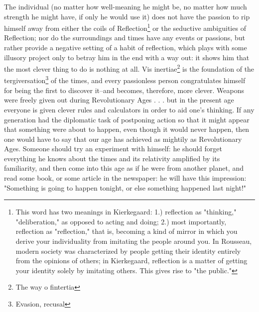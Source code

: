 \documentclass[12pt]{article}
\begin{document}
   The individual (no matter how well-meaning he might be, no matter how
much strength he might have, if only he would use it) does not have the
passion to rip himself away from either the coils of 
Reflection\footnote{This word has two meanings in Kierkegaard: 1.) reflection as "thinking,"
"deliberation," as opposed to acting and doing; 2.) most importantly,
reflection as "reflection," that is, becoming a kind of mirror in which you
derive your individuality from imitating the people around you. In Rousseau,
modern society was characterized by people getting their identity entirely
from the opinions of others; in Kierkegaard, reflection is a matter of
getting your identity solely by imitating others. This gives rise to "the
public."} or the
seductive ambiguities of Reflection; nor do the surroundings and times have
any events or passions, but rather provide a negative setting of a habit of
reflection, which plays with some illusory project only to betray him in the
end with a way out: it shows him that the most clever thing to do is nothing
at all. Vis inertiae\footnote{The way o fintertia} is the foundation of 
the tergiversation\footnote{Evasion, recusal} of the
times, and every passionless person congratulates himself for being the
first to discover it--and becomes, therefore, more clever. Weapons were
freely given out during Revolutionary Ages . . . but in the present age
everyone is given clever rules and calculators in order to aid one's
thinking. If any generation had the diplomatic task of postponing action so
that it might appear that something were about to happen, even though it
would never happen, then one would have to say that our age has achieved as
mightily as Revolutionary Ages. Someone should try an experiment with
himself: he should forget everything he knows about the times and its
relativity amplified by its familiarity, and then come into this age as if
he were from another planet, and read some book, or some article in the
newspaper: he will have this impression: "Something is going to happen
tonight, or else something happened last night!"
\end{document}

